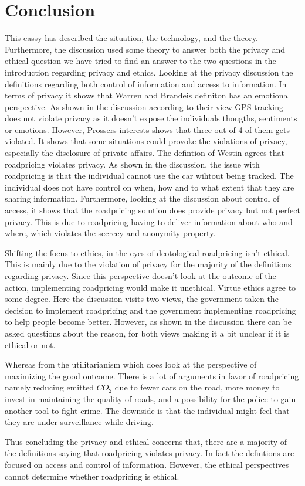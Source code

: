 \section{Conclusion}
This eassy has described the situation, the technology, and the theory. Furthermore, the discussion used some theory to answer both the privacy and ethical question we have tried to find an answer to the two questions in the introduction regarding privacy and ethics. Looking at the privacy discussion the definitions regarding both control of information and access to information. In terms of privacy it shows that Warren and Brandeis definiton has an emotional perspective. As shown in the discussion according to their view GPS tracking does not violate privacy as it doesn't expose the individuals thougths, sentiments or emotions. However, Prossers interests shows that three out of 4 of them gets violated. It shows that some situations could provoke the violations of privacy, especially the disclosure of private affairs. The defintion of Westin agrees that roadpricing violates privacy. As shown in the discussion, the issue with roadpricing is that the individual cannot use the car wihtout being tracked. The individual does not have control on when, how and to what extent that they are sharing information. Furthermore, looking at the discussion about control of access, it shows that the roadpricing solution does provide privacy but not perfect privacy. This is due to roadpricing having to deliver information about who and where, which violates the secrecy and anonymity property. 

Shifting the focus to ethics, in the eyes of deotological roadpricing isn't ethical. This is mainly due to the violation of privacy for the majority of the definitions regarding privacy. Since this perspective doesn't look at the outcome of the action, implementing roadpricing would make it unethical. Virtue ethics agree to some degree. Here the discussion visits two views, the government taken the decision to implement roadpricing and the government implementing roadpricing to help people become better. However, as shown in the discussion there can be asked questions about the reason, for both views making it a bit unclear if it is ethical or not.

Whereas from the utilitarianism which does look at the perspective of maximizing the good outcome. There is a lot of arguments in favor of roadpricing namely reducing emitted $CO_2$ due to fewer cars on the road, more money to invest in maintaining the quality of roads, and a possibility for the police to gain another tool to fight crime. The downside is that the individual might feel that they are under surveillance while driving. 

Thus concluding the privacy and ethical concerns that, there are a majority of the definitions saying that roadpricing violates privacy. In fact the defintions are focused on access and control of information. However, the ethical perspectives cannot determine whether roadpricing is ethical.